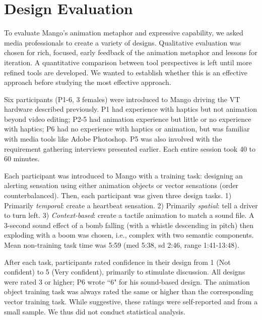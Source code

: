 %
%
\section{Design Evaluation}
To evaluate Mango's %
animation metaphor and expressive capability,
we asked media professionals to
create a variety of designs.
Qualitative evaluation was chosen for rich, focused, early feedback of the animation metaphor and lessons for iteration.
A quantitative comparison between tool perspectives is left until more refined tools are developed.
We wanted to establish whether this is an effective approach before studying the most effective approach.


Six participants (P1-6, 3 females) were introduced to Mango driving %
the  VT hardware described previously. %
P1 had experience with haptics but not animation beyond video editing;
P2-5 had animation experience but little or no experience with haptics;
P6 had no experience with haptics or animation, but was familiar with media tools like Adobe Photoshop.
P5 was also involved with the requirement gathering interviews presented earlier.
Each entire session took 40 to 60 minutes.


Each participant was introduced to Mango with a training task: %
designing an alerting sensation using %
either animation objects or vector sensations (order counterbalanced).
Then, each participant was given three design tasks.
1) Primarily \emph{temporal}: create a heartbeat sensation.
2) Primarily \emph{spatial}: tell a driver to turn left.
3) \emph{Context-based}: create a tactile animation to match a sound file.
A 3-second sound effect of a bomb falling (with a whistle descending in pitch) then exploding with a boom was chosen, i.e., complex with two semantic components.
Mean non-training task time was 5:59 (med 5:38, sd 2:46, range 1:41-13:48).

After each task, participants rated confidence in their design from 1 (Not confident) to 5 (Very confident), primarily to stimulate discussion.
All designs were rated 3 or higher; P6 wrote ``6" for his sound-based design.
The animation object training task was always rated the same or higher than the corresponding vector training task.
While suggestive, these ratings were self-reported and from a small sample.
We thus did not conduct statistical analysis.

